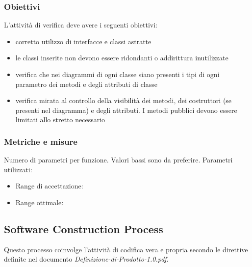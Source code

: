 \documentclass[a4paper,11pt]{article}
\begin{document}
\subsubsection{Obiettivi}
L'attività di verifica deve avere i seguenti obiettivi:
\begin{itemize}

\item corretto utilizzo di interfacce e classi astratte
\item le classi inserite non devono essere ridondanti o addirittura inutilizzate
\item verifica che nei diagrammi di ogni classe siano presenti i tipi di ogni parametro dei metodi e degli attributi di classe
\item verifica mirata al controllo della visibilità dei metodi, dei costruttori (se presenti nel diagramma) e degli attributi. I metodi pubblici devono essere limitati allo stretto necessario
\end{itemize}
\subsubsection{Metriche e misure}
Numero di parametri per funzione. Valori bassi sono da preferire.
Parametri utilizzati:
\begin{itemize}
	\item Range di accettazione: \begin{math}[0 - 7]\end{math}
	\item Range ottimale: \begin{math}[0 - 5]\end{math}
	\end{itemize}
\subsection{Software Construction Process}
Questo processo coinvolge l'attività di codifica vera e propria secondo le direttive definite nel documento \textit{Definizione-di-Prodotto-1.0.pdf}.
\end{document}
